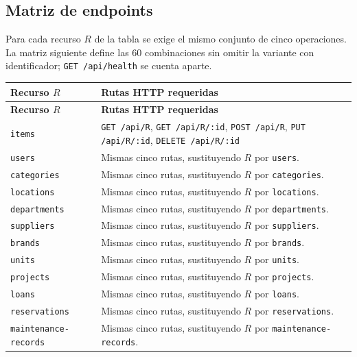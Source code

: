 \documentclass[12pt,a4paper]{article}
\begin{document}
\subsection{Matriz de endpoints}
Para cada recurso $R$ de la tabla se exige el mismo conjunto de cinco operaciones. La matriz siguiente define las 60 combinaciones sin omitir la variante con identificador; \texttt{GET /api/health} se cuenta aparte.

\begin{longtable}{p{}p{}}
\toprule
\textbf{Recurso $R$} & \textbf{Rutas HTTP requeridas} \\
\midrule
\endfirsthead
\toprule
\textbf{Recurso $R$} & \textbf{Rutas HTTP requeridas} \\
\midrule
\endhead
\texttt{items} & \multicolumn{1}{p{0.65\textwidth}}{\texttt{GET /api/R}, \texttt{GET /api/R/:id}, \texttt{POST /api/R}, \texttt{PUT /api/R/:id}, \texttt{DELETE /api/R/:id}} \\
\texttt{users} & Mismas cinco rutas, sustituyendo $R$ por \texttt{users}. \\
\texttt{categories} & Mismas cinco rutas, sustituyendo $R$ por \texttt{categories}. \\
\texttt{locations} & Mismas cinco rutas, sustituyendo $R$ por \texttt{locations}. \\
\texttt{departments} & Mismas cinco rutas, sustituyendo $R$ por \texttt{departments}. \\
\texttt{suppliers} & Mismas cinco rutas, sustituyendo $R$ por \texttt{suppliers}. \\
\texttt{brands} & Mismas cinco rutas, sustituyendo $R$ por \texttt{brands}. \\
\texttt{units} & Mismas cinco rutas, sustituyendo $R$ por \texttt{units}. \\
\texttt{projects} & Mismas cinco rutas, sustituyendo $R$ por \texttt{projects}. \\
\texttt{loans} & Mismas cinco rutas, sustituyendo $R$ por \texttt{loans}. \\
\texttt{reservations} & Mismas cinco rutas, sustituyendo $R$ por \texttt{reservations}. \\
\texttt{maintenance-records} & Mismas cinco rutas, sustituyendo $R$ por \texttt{maintenance-records}. \\
\bottomrule
\end{longtable}
\end{document}

